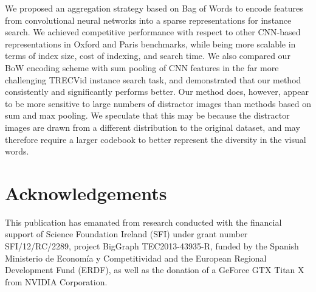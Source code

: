 \documentclass{sig-arxiv}
\begin{document}
We proposed an aggregation strategy based on Bag of Words to encode features from convolutional neural networks into a sparse representations for instance search. We achieved competitive performance with respect to other CNN-based representations in Oxford and Paris benchmarks, while being more scalable in terms of index size, cost of indexing, and search time. We also compared our BoW encoding scheme with sum pooling of CNN features in the far more challenging TRECVid instance search task, and demonstrated that our method consistently and significantly performs better. Our method does, however, appear to be more sensitive to large numbers of distractor images than methods based on sum and max pooling. We speculate that this may be because the distractor images are drawn from a different distribution to the original dataset, and may therefore require a larger codebook to better represent the diversity in the visual words. 

\section*{Acknowledgements}
This publication has emanated from research conducted with the financial support of Science Foundation Ireland (SFI) under grant number SFI/12/RC/2289, project BigGraph TEC2013-43935-R, funded by the Spanish Ministerio de Econom\'ia y Competitividad and the European Regional Development Fund (ERDF), as well as the donation of a GeForce GTX Titan X from NVIDIA Corporation.


{


}
\end{document}
